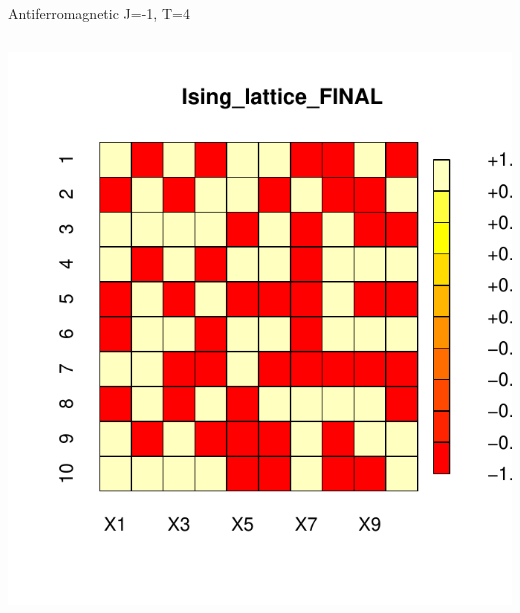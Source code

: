 \documentclass{beamer}
\begin{document}
\begin{frame}{Antiferromagnetic J=-1, T=4}
\begin{columns}
\begin{column}{0.5\textwidth}
\begin{center}
     \includegraphics[width=\textwidth]{Pic/J-1_60_2500_T=4_FINAL.pdf}
     \end{center}
\end{column}
\end{columns}
\end{frame}
\end{document}
